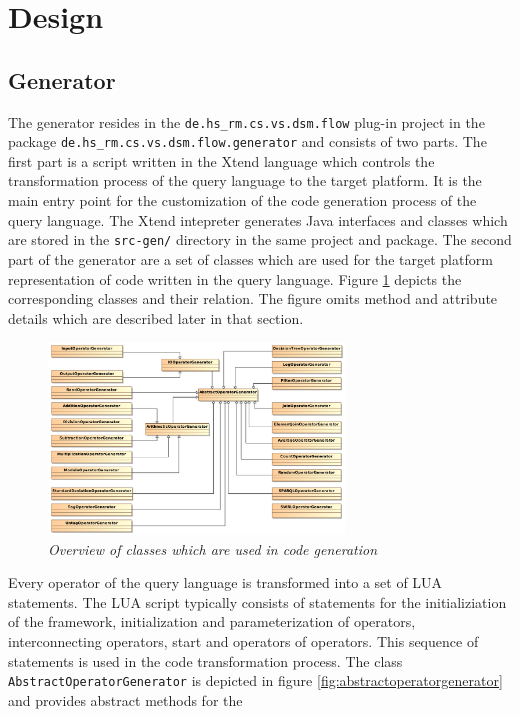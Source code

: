 \section{Design}
\subsection{Generator}
The generator resides in the \texttt{de.hs\_rm.cs.vs.dsm.flow} plug-in project 
in the package \texttt{de.hs\-\_rm.\-cs.vs.dsm.flow.generator} and consists of 
two parts. The first part is a script written in the Xtend \cite{xtend} language 
which controls the transformation process of the query language to the target 
platform. It is the main entry point for the customization of the code 
generation process of the query language. The Xtend intepreter generates 
Java interfaces and classes which are stored in the \texttt{src-gen/} directory
in the same project and package. The second part of the generator are a set of
classes which are used for the target platform representation of code written in
the query language. Figure \ref{fig:generator} depicts the corresponding classes
and their relation. The figure omits method and attribute details which are 
described later in that section.
\begin{figure}[htpb]
  \centering
  \includegraphics[width=0.7\textwidth]{figures/overview}
  \caption{\emph{Overview of classes which are used in code generation}}
  \label{fig:generator}
\end{figure}
Every operator of the query language is transformed into a set of LUA 
statements. The LUA script typically consists of statements for the 
initializiation of the framework, initialization and parameterization of 
operators, interconnecting operators, start and operators of operators. This 
sequence of statements is used in the code transformation process. The class 
\texttt{AbstractOperatorGenerator} is depicted in figure 
\ref{fig:abstractoperatorgenerator} and provides abstract methods for the 
